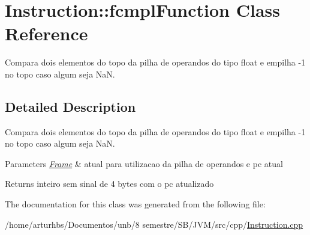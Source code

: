 \hypertarget{classInstruction_1_1fcmplFunction}{}\section{Instruction\+:\+:fcmpl\+Function Class Reference}
\label{classInstruction_1_1fcmplFunction}


Compara dois elementos do topo da pilha de operandos do tipo float e empilha -\/1 no topo caso algum seja NaN.  




\subsection{Detailed Description}
Compara dois elementos do topo da pilha de operandos do tipo float e empilha -\/1 no topo caso algum seja NaN. 


\begin{DoxyParams}{Parameters}
{\em \hyperlink{classFrame}{Frame}} & atual para utilizacao da pilha de operandos e pc atual \\
\hline
\end{DoxyParams}
\begin{DoxyReturn}{Returns}
inteiro sem sinal de 4 bytes com o pc atualizado 
\end{DoxyReturn}


The documentation for this class was generated from the following file\+:\begin{DoxyCompactItemize}
\item 
/home/arturhbs/\+Documentos/unb/8 semestre/\+S\+B/\+J\+V\+M/src/cpp/\hyperlink{Instruction_8cpp}{Instruction.\+cpp}\end{DoxyCompactItemize}
